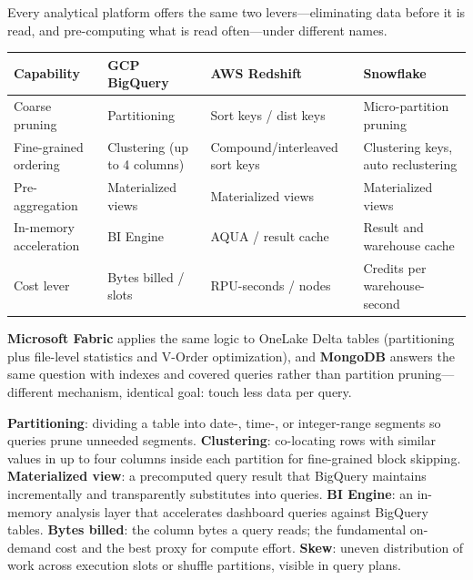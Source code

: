 \begin{crosscloud}
Every analytical platform offers the same two levers---eliminating data before it is read, and pre-computing what is read often---under different names.

\vspace{2mm}
{\footnotesize
\begin{tabular}{@{}p{2.8cm}p{3.0cm}p{3.0cm}p{3.0cm}@{}} \\
\toprule
\textbf{Capability} & \textbf{GCP BigQuery} & \textbf{AWS Redshift} & \textbf{Snowflake} \\
\midrule
Coarse pruning & Partitioning & Sort keys / dist keys & Micro-partition pruning \\
Fine-grained ordering & Clustering (up to 4 columns) & Compound/interleaved sort keys & Clustering keys, auto reclustering \\
Pre-aggregation & Materialized views & Materialized views & Materialized views \\
In-memory acceleration & BI Engine & AQUA / result cache & Result and warehouse cache \\
Cost lever & Bytes billed / slots & RPU-seconds / nodes & Credits per warehouse-second \\
\bottomrule
\end{tabular}}

\vspace{1mm}
\textbf{Microsoft Fabric} applies the same logic to OneLake Delta tables (partitioning plus file-level statistics and V-Order optimization), and \textbf{MongoDB} answers the same question with indexes and covered queries rather than partition pruning---different mechanism, identical goal: touch less data per query.
\end{crosscloud}

\begin{keyterms}
\textbf{Partitioning}: dividing a table into date-, time-, or integer-range segments so queries prune unneeded segments.
\textbf{Clustering}: co-locating rows with similar values in up to four columns inside each partition for fine-grained block skipping.
\textbf{Materialized view}: a precomputed query result that BigQuery maintains incrementally and transparently substitutes into queries.
\textbf{BI Engine}: an in-memory analysis layer that accelerates dashboard queries against BigQuery tables.
\textbf{Bytes billed}: the column bytes a query reads; the fundamental on-demand cost and the best proxy for compute effort.
\textbf{Skew}: uneven distribution of work across execution slots or shuffle partitions, visible in query plans.
\end{keyterms}

